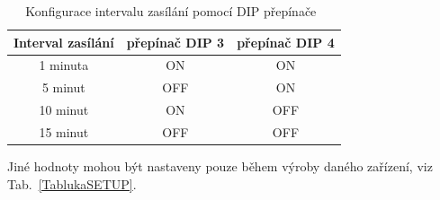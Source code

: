 \begin{table}[!ht]
\centering
\caption{Konfigurace intervalu zasílání pomocí DIP přepínače~\cite{CidloWeptech}}
\label{TablukaDIP}
\begin{tabular}{|c|c|c|}
\hline
\textbf{Interval zasílání} & přepínač DIP 3 & přepínač DIP 4 \\ \hline \hline
1 minuta & ON & ON \\ \hline
5 minut & OFF & ON \\ \hline
10 minut & ON & OFF \\ \hline
15 minut & OFF & OFF \\ \hline \hline
\end{tabular}
\end{table}

Jiné hodnoty mohou být nastaveny pouze během výroby daného zařízení, viz Tab.~\ref{TablukaSETUP}.

